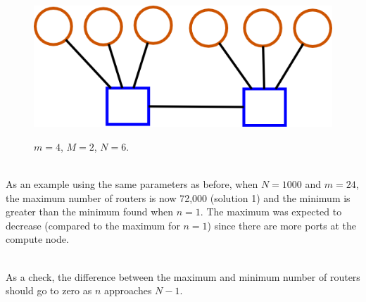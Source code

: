 \documentclass[pdftex]{article}
\begin{document}
\begin{figure}[h!]
\begin{center}
\includegraphics[scale=0.3]{pictures/N6_n1_M2_m4}
\label{fig:fewer_routers_M2}
 \caption{$m=4$, $M=2$, $N=6$.}
\end{center}
\end{figure}



\ \\
As an example using the same parameters as before, when $N=1000$ and $m=24$, the maximum number of routers is now 72,000 (solution 1) and the minimum is greater than the minimum found when $n=1$. The maximum was expected to decrease (compared to the maximum for $n=1$) since there are more ports at the compute node.

\ \\
As a check, the difference between the maximum and minimum number of routers should go to zero as $n$ approaches $N-1$. 
\end{document}
